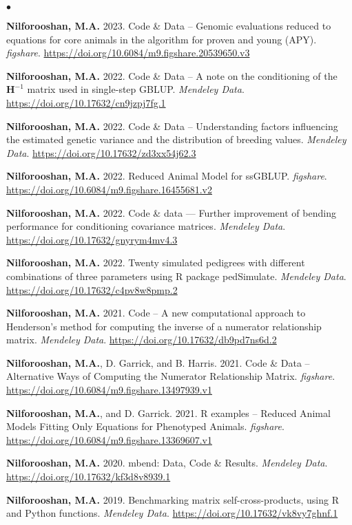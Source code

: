 \documentclass[margin,line]{res}
\newenvironment{list2}{
  \begin{list}{$\bullet$}{%
      \setlength{\itemsep}{0in}
      \setlength{\parsep}{0in} \setlength{\parskip}{0in}
      \setlength{\topsep}{0in} \setlength{\partopsep}{0in}
      \setlength{\leftmargin}{0.2in}}}{\end{list}}
\begin{document}
\begin{resume}
  \begin{list2}
    \item {\bf Nilforooshan, M.A.} 2023. Code \& Data -- Genomic evaluations reduced to equations for core animals in the algorithm for proven and young (APY). {\em figshare}. \url{https://doi.org/10.6084/m9.figshare.20539650.v3}
    \item {\bf Nilforooshan, M.A.} 2022. Code \& Data -- A note on the conditioning of the $\mathbf H^{-1}$ matrix used in single-step GBLUP. {\em Mendeley Data}. \url{https://doi.org/10.17632/cn9jzpj7fg.1}
    \item {\bf Nilforooshan, M.A.} 2022. Code \& Data -- Understanding factors influencing the estimated genetic variance and the distribution of breeding values. {\em Mendeley Data}. \url{https://doi.org/10.17632/zd3xx54j62.3}
    \item {\bf Nilforooshan, M.A.} 2022. Reduced Animal Model for ssGBLUP. {\em figshare}. \url{https://doi.org/10.6084/m9.figshare.16455681.v2}
    \item {\bf Nilforooshan, M.A.} 2022. Code \& data --- Further improvement of bending performance for conditioning covariance matrices. {\em Mendeley Data}. \url{https://doi.org/10.17632/gnyrym4mv4.3}
    \item {\bf Nilforooshan, M.A.} 2022. Twenty simulated pedigrees with different combinations of three parameters using R package pedSimulate. {\em Mendeley Data}. \url{https://doi.org/10.17632/c4pv8w8pmp.2}
    \item {\bf Nilforooshan, M.A.} 2021. Code -- A new computational approach to Henderson's method for computing the inverse of a numerator relationship matrix. {\em Mendeley Data}. \url{https://doi.org/10.17632/db9pd7ns6d.2}
    \item {\bf Nilforooshan, M.A.}, D. Garrick, and B. Harris. 2021. Code \& Data -- Alternative Ways of Computing the Numerator Relationship Matrix. {\em figshare}. \url{https://doi.org/10.6084/m9.figshare.13497939.v1}
    \item {\bf Nilforooshan, M.A.}, and D. Garrick. 2021. R examples -- Reduced Animal Models Fitting Only Equations for Phenotyped Animals. {\em figshare}. \url{https://doi.org/10.6084/m9.figshare.13369607.v1}
    \item {\bf Nilforooshan, M.A.} 2020. mbend: Data, Code \& Results. {\em Mendeley Data}. \url{https://doi.org/10.17632/kf3d8v8939.1}
    \item {\bf Nilforooshan, M.A.} 2019. Benchmarking matrix self-cross-products, using R and Python functions. {\em Mendeley Data}. \url{https://doi.org/10.17632/vk8vy7ghnf.1}
  \end{list2}

\end{resume}
\end{document}

